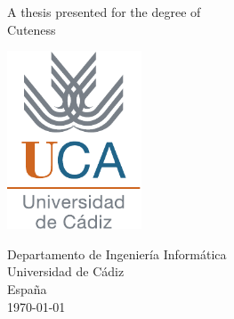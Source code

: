 \begin{titlepage}
\begin{center}
    \vspace*{1cm}
    
    \Huge
    \textbf{\thetitle}
    
    
    \vspace{1.5cm}
    
    \Large
    \textbf{\theauthor}
    
    \vfill
    
    A thesis presented for the degree of \\
    Cuteness
    
    \vspace{0.8cm}
    \includegraphics[width=0.3\textwidth]{images/uca-logo.pdf}
    
    \vspace{0.5cm}
    
    \large
    Departamento de Ingeniería Informática \\
    Universidad de Cádiz \\
    España \\
    \today
    
\end{center}
\end{titlepage}